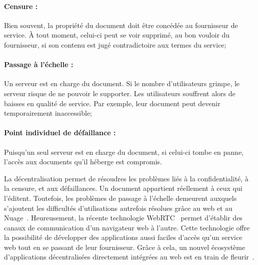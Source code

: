 \paragraph{Censure :} Bien souvent, la propriété du document doit être concédée
au fournisseur de service. À tout moment, celui-ci peut se voir supprimé, au bon
vouloir du fournisseur, si son contenu est jugé contradictoire aux termes du
service;

\paragraph{Passage à l'échelle :} Un serveur est en charge du document. Si le
nombre d'utilisateurs grimpe, le serveur risque de ne pouvoir le supporter. Les
utilisateurs souffrent alors de baisses en qualité de service. Par exemple, leur
document peut devenir temporairement inaccessible;

\paragraph{Point individuel de défaillance :} Puisqu'un seul serveur est en
charge du document, si celui-ci tombe en panne, l'accès aux documents qu'il
héberge est compromis.
  
La décentralisation permet de résoudres les problèmes liés à la confidentialité,
à la censure, et aux défaillances. Un document appartient réellement à ceux qui
l'éditent. Toutefois, les problèmes de passage à l'échelle demeurent auxquels
s'ajoutent les difficultés d'utilisations autrefois résolues grâce au web et au
Nuage~\cite{mell2011national}. Heureusement, la récente technologie
WebRTC~\cite{webrtc} permet d'établir des canaux de communication d'un
navigateur web à l'autre. Cette technologie offre la possibilité de développer
des applications aussi faciles d'accès qu'un service web tout en se passant de
leur fournisseur. Grâce à cela, un nouvel écosystème d'applications
décentralisées directement intégrées au web est en train de
fleurir~\cite{webtorrent}.

